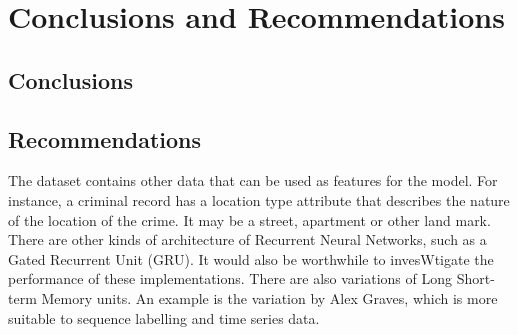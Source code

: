 
\chapter{Conclusions and Recommendations}  %

\section{Conclusions}

\section{Recommendations}
    The dataset contains other data that can be used as features for the model. For instance, a criminal record has a location type attribute that describes the nature of the location of the crime. It may be a street, apartment or other land mark.
    There are other kinds of architecture of Recurrent Neural Networks, such as a Gated Recurrent Unit (GRU). It would also be worthwhile to invesWtigate the performance of these implementations.
    There are also variations of Long Short-term Memory units. An example is the variation by Alex Graves, which is more suitable to sequence labelling and time series data.